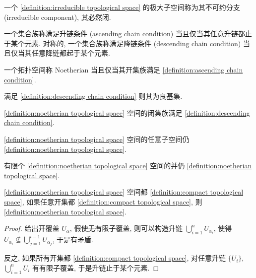 \begin{definition}
    \label {definition:irreducible component}
    一个 \ref{definition:irreducible topological space} 的极大子空间称为其不可约分支 (irreducible component), 其必然闭.
\end{definition}

\begin{definition}[升链条件]
    \label {definition:ascending chain condition}
    一个集合族称满足升链条件 (ascending chain condition) 当且仅当其任意升链都止于某个元素.
    \label {definition:descending chain condition}
    对称的, 一个集合族称满足降链条件 (descending chain condition) 当且仅当其任意降链都起于某个元素.
\end{definition}

\begin{definition}[Noetherian]
    \label {definition:noetherian topological space}
    一个拓扑空间称 Noetherian 当且仅当其开集族满足 \ref{definition:ascending chain condition}.
\end{definition}

\begin{lemma}
    满足 \ref{definition:descending chain condition} 则其为良基集.
\end{lemma}

\begin{corollary}
    \ref{definition:noetherian topological space} 空间的闭集族满足 \ref{definition:descending chain condition}.
\end{corollary}

\begin{lemma}
    \ref{definition:noetherian topological space} 空间的任意子空间仍 \ref{definition:noetherian topological space}. 
\end{lemma}

\begin{lemma}
    有限个 \ref{definition:noetherian topological space} 空间的并仍 \ref{definition:noetherian topological space}.
\end{lemma}

\begin{lemma}
    \ref{definition:noetherian topological space} 空间都 \ref{definition:compact topological space},
    如果任意开集都 \ref{definition:compact topological space}, 则 \ref{definition:noetherian topological space}.

    \begin{proof}
        给出开覆盖 \(U_\alpha\), 假使无有限子覆盖, 则可以构造升链 \(\bigcup_{i = 1}^n U_{\alpha_i}\), 
        使得 \(U_{\alpha_i} \nsubseteq \bigcup_{j = 1}^{i-1} U_{\alpha_j}\), 于是有矛盾.

        反之, 如果所有开集都 \ref{definition:compact topological space}, 对任意升链 \(\{U_i\}\), 
        \(\bigcup_{i = 1}^n U_i\) 有有限子覆盖, 于是升链止于某个元素.
    \end{proof}
\end{lemma}

